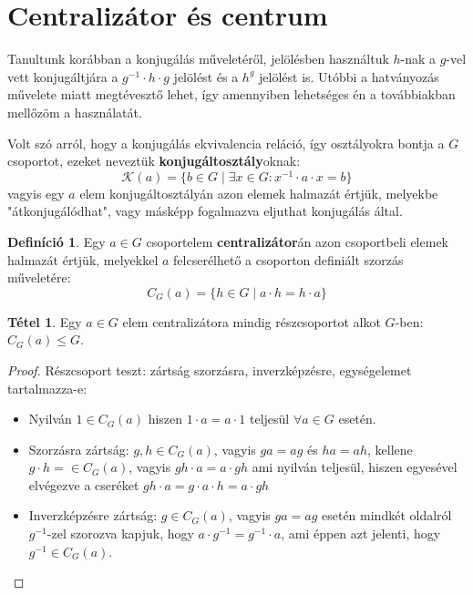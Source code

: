 \documentclass[12pt]{book}
\theoremstyle{plain} %
\theoremstyle{definition} %
\newtheorem{defi/}{Definíció}[section]
\newenvironment{defi}
  {\renewcommand{\qedsymbol}{$\clubsuit$}%
   \pushQED{\qed}\begin{defi/}}
  {\popQED\end{defi/}}
\newtheorem{theo/}{Tétel}[section]
\newenvironment{theo}
  {\renewcommand{\qedsymbol}{$\clubsuit$}%
   \pushQED{\qed}\begin{theo/}}
  {\popQED\end{theo/}}
\theoremstyle{remark}
\renewcommand\qedsymbol{$\blacksquare$}
\numberwithin{equation}{section}  %
\begin{document}
	\section{Centralizátor és centrum}
	
	Tanultunk korábban a konjugálás műveletéről, jelölésben használtuk $h$-nak a $g$-vel vett konjugáltjára a $g^{-1}\cdot h\cdot g$ jelölést és a $h^g$ jelölést is. Utóbbi a hatványozás művelete miatt megtévesztő lehet, így amennyiben lehetséges én a továbbiakban mellőzöm a használatát.
	
	Volt szó arról, hogy a konjugálás ekvivalencia reláció, így osztályokra bontja a $G$ csoportot, ezeket neveztük \textbf{konjugáltosztály}oknak:
	\[ \mathcal{K}(a) = \{b \in G \mid \exists x\in G\colon x^{-1} \cdot a \cdot x = b  \}  \]
	vagyis egy $a$ elem konjugáltosztályán azon elemek halmazát értjük, melyekbe "átkonjugálódhat", vagy másképp fogalmazva eljuthat konjugálás által.
	
	\begin{defi}
		Egy $a\in G$ csoportelem \textbf{centralizátor}án azon csoportbeli elemek halmazát értjük, melyekkel $a$ felcserélhető a csoporton definiált szorzás műveletére:
		\[ C_G(a) = \{ h\in G \mid a\cdot h = h\cdot a  \}  \]
	\end{defi}

	\begin{theo}
		Egy $a\in G$ elem centralizátora mindig részcsoportot alkot $G$-ben: $C_G(a) \leq G$.
	\end{theo}

	\begin{proof}
		Részcsoport teszt: zártság szorzásra, inverzképzésre, egységelemet tartalmazza-e:
		\begin{itemize}
			\item Nyilván $1\in C_G(a)$ hiszen $1\cdot a = a\cdot 1$ teljesül $\forall a\in G$ esetén.
			\item Szorzásra zártság: $g,h\in C_G(a)$, vagyis $ga = ag$ és $ha=ah$, kellene $g\cdot h = \in C_G(a)$, vagyis $gh\cdot a = a\cdot gh$ ami nyilván teljesül, hiszen egyesével elvégezve a cseréket $gh\cdot a = g\cdot a \cdot h = a \cdot gh$
			\item Inverzképzésre zártság: $g\in C_G(a)$, vagyis $ga=ag$ esetén mindkét oldalról $g^{-1}$-zel szorozva kapjuk, hogy $a\cdot g^{-1} = g^{-1} \cdot a$, ami éppen azt jelenti, hogy $g^{-1}\in C_G(a)$.
		\end{itemize}
	\end{proof}
	
\end{document}
